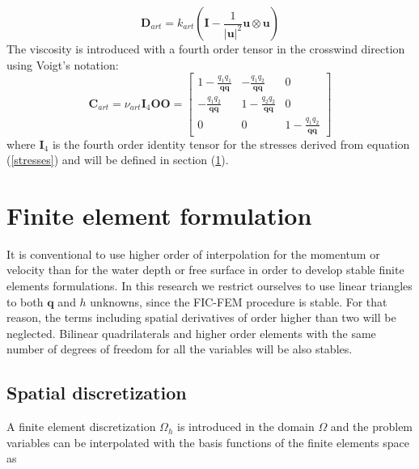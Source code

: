 \documentclass[a4paper,12pt]{article}
\newcommand{\abs}[1]{\lvert#1\rvert}
\begin{document}
\begin{equation}
\mathbf{D}_{art} = k_{art}
\left( \mathbf{I} - \frac{1}{\abs{\mathbf{u}}^2} \mathbf{u} \otimes \mathbf{u} \right)
\end{equation}
The viscosity is introduced with a fourth order tensor in the crosswind direction using Voigt's notation:
\begin{subequations}
\begin{equation}
\mathbf{C}_{art} = \nu_{art} \mathbf{I}_4 \mathbf{O}
\end{equation}
\begin{equation}
\mathbf{O} = \left[\begin{matrix}
    1-\frac{q_1q_1}{\mathbf{q}\mathbf{q}} & -\frac{q_1q_2}{\mathbf{q}\mathbf{q}} & 0 \\
    -\frac{q_1q_2}{\mathbf{q}\mathbf{q}} & 1-\frac{q_2q_2}{\mathbf{q}\mathbf{q}} & 0 \\
    0 & 0 & 1-\frac{q_1q_2}{\mathbf{q}\mathbf{q}}
\end{matrix}\right]
\end{equation}
\end{subequations}
where $\mathbf{I}_4$ is the fourth order identity tensor for the stresses derived from equation (\ref{stresses}) and will be defined in section (\ref{sec:fem}).


\section{Finite element formulation} \label{sec:fem} 

It is conventional to use higher order of interpolation for the momentum or velocity than for the water depth or free surface \cite{hood1974,heniche2000,bercovier1979} in order to develop stable finite elements formulations. In this research we restrict ourselves to use linear triangles to both $\mathbf{q}$ and $h$ unknowns, since the FIC-FEM procedure is stable. For that reason, the terms including spatial derivatives of order higher than two will be neglected. Bilinear quadrilaterals and higher order elements with the same number of degrees of freedom for all the variables will be also stables.

\subsection{Spatial discretization}

A finite element discretization $\Omega_h$ is introduced in the domain $\Omega$ and the problem variables can be interpolated with the basis functions of the finite elements space as
\end{document}
